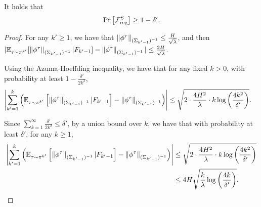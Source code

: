 \begin{lemma} 
	It holds that
	\begin{align*}
		\Pr \left[  \mathcal{F}^{\textup{S}}_{\textup{reg}}  \right] \geq 1-\delta' .
	\end{align*}
\end{lemma}
\begin{proof}
	For any $k'\geq 1$, we have that $\left\|  \phi^{\tau} \right\|_{(\Sigma_{k'-1})^{-1}} \leq \frac{H}{\sqrt{\lambda}}$, and then $|\mathbb{E}_{\tau \sim \pi^{k'}} [\left\|  \phi^{\tau} \right\|_{(\Sigma_{k'-1})^{-1}} | F_{k'-1}] - \left\|  \phi^{\tau} \right\|_{(\Sigma_{k'-1})^{-1}}| \leq \frac{2H}{\sqrt{\lambda}}$. 
	
	
	Using the Azuma-Hoeffding inequality, we have that for any fixed $k>0$, with probability at least $1-\frac{\delta'}{2k^2}$,
	\begin{align*}
		\left| \sum_{k'=1}^{k} \left(  \mathbb{E}_{\tau \sim \pi^{k'}}\left[  \left\|  \phi^{\tau} \right\|_{(\Sigma_{k'-1})^{-1}} | F_{k'-1} \right] - \left\|  \phi^{\tau} \right\|_{(\Sigma_{k'-1})^{-1}}  \right)  \right| &\leq \sqrt{ 2 \cdot \frac{4H^2}{\lambda} \cdot k \log\left( \frac{4k^2}{\delta'} \right) } .
	\end{align*}
	
	Since $\sum_{k=1}^{\infty} \frac{\delta'}{2k^2} \leq \delta'$, by a union bound over $k$, we have that with probability at least $\delta'$, for any $k\geq 1$,
	\begin{align*}
		\left| \sum_{k'=1}^{k} \left(  \mathbb{E}_{\tau \sim \pi^{k'}}\left[  \left\|  \phi^{\tau} \right\|_{(\Sigma_{k'-1})^{-1}} | F_{k'-1} \right] - \left\|  \phi^{\tau} \right\|_{(\Sigma_{k'-1})^{-1}}  \right)  \right| &\leq \sqrt{ 2 \cdot \frac{4H^2}{\lambda} \cdot k \log\left( \frac{4k^2}{\delta'} \right) } 
		\\
		&\leq 4H \sqrt{ \frac{k}{\lambda} \log\left( \frac{4k}{\delta'} \right) } .
	\end{align*}
\end{proof}



